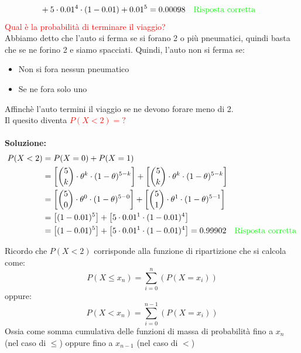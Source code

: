 \documentclass{article}  %
\theoremstyle{definition}
\begin{document}
\begin{esercizio}[Esercizio]
\begin{align*}
		 & + 5 \cdot 0.01^4 \cdot (1-0.01) + 0.01^5 = 0.00098 \quad \textcolor{green}{\text{Risposta corretta}}
	\end{align*}
	\textcolor{red}{Qual è la probabilità di terminare il viaggio?} \\
	Abbiamo detto che l'auto si ferma se si forano 2 o più pneumatici, quindi basta che se ne forino 2 e siamo spacciati.
	Quindi, l'auto non si ferma se:
	\begin{itemize}
		\item Non si fora nessun pneumatico
		\item Se ne fora solo uno
	\end{itemize}
	Affinchè l'auto termini il viaggio se ne devono forare meno di 2. \\
	Il quesito diventa \textcolor{red}{$P(X<2)=?$} \\ \\
	\textbf{Soluzione:}
	\begin{align*}
		P(X < 2)
		 & = P(X=0) + P(X=1)                                                                                                                        \\
		 & = \left[\binom{5}{k}\cdot \theta^k \cdot (1-\theta)^{5-k}\right] + \left[\binom{5}{k}\cdot \theta^k \cdot (1-\theta)^{5-k}\right]        \\
		 & = \left[\binom{5}{0}\cdot \theta^0 \cdot (1-\theta)^{5-0}\right] + \left[\binom{5}{1}\cdot \theta^1 \cdot (1-\theta)^{5-1}\right]        \\
		 & = \left[(1-0.01)^{5}\right] + \left[5 \cdot 0.01^1 \cdot (1-0.01)^{4}\right]                                                             \\
		 & = \left[(1-0.01)^{5}\right] + \left[5 \cdot 0.01^1 \cdot (1-0.01)^{4}\right] = 0.99902 \quad \textcolor{green}{\text{Risposta corretta}}
	\end{align*}
	\begin{osservazioni}[Osservazione su $P(X < 2)$]
		Ricordo che $P(X < 2)$ corrisponde alla funzione di ripartizione che si calcola come:
		\[
			P(X \leq x_n) = \sum_{i=0}^{n} \left(P(X=x_i)\right)
		\]
		oppure:
		\[
			P(X < x_n) = \sum_{i=0}^{n-1} \left(P(X=x_i)\right)
		\]
		Ossia come somma cumulativa delle funzioni di massa di probabilità fino a $x_n$ (nel caso di $\leq$) oppure fino a $x_{n-1}$ (nel caso di $<$)
	\end{osservazioni}
\end{esercizio}
\end{document}
